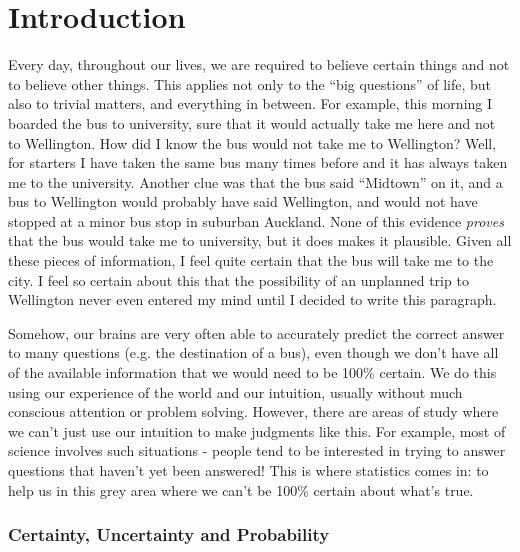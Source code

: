 \chapter{Introduction}
Every day, throughout our lives, we are required 
to believe certain things and not to believe other things. This applies not
only to the ``big questions'' of life, but also to trivial matters, and 
everything in between. For example, this morning I boarded the bus to 
university, sure that it would actually take me here and not to Wellington.
How did I know the bus would not take me to Wellington? Well, for starters
I have taken the same bus many times before and it has always taken me to the
university. Another clue was that the bus said ``Midtown'' on it, and a bus
to Wellington would probably have said Wellington, and would not have stopped
at a minor bus stop in suburban Auckland.
None of this evidence {\it proves} that the bus would take me to university,
but it does makes it plausible. Given all these pieces of information, I feel
quite certain that the bus will take me to the city. I feel so certain
about this that the possibility of an
unplanned trip to Wellington never even entered my mind until I decided to
write this paragraph.

Somehow, our brains are very often able to accurately predict the correct answer
to many questions (e.g. the destination of a bus), even though we don't have
all of the available information that we would need to be 100\% certain.
We do this using our experience of the world and our intuition, usually 
without much conscious attention or problem solving. However, there are areas
of study where we can't just use our intuition to make judgments like this.
For example, most of science involves such situations - people tend to be
interested in trying to answer questions that haven't yet been answered!
This is where statistics comes in: to help us in this grey area where we can't
be 100\% certain about what's true.


\subsection{Certainty, Uncertainty and Probability}


